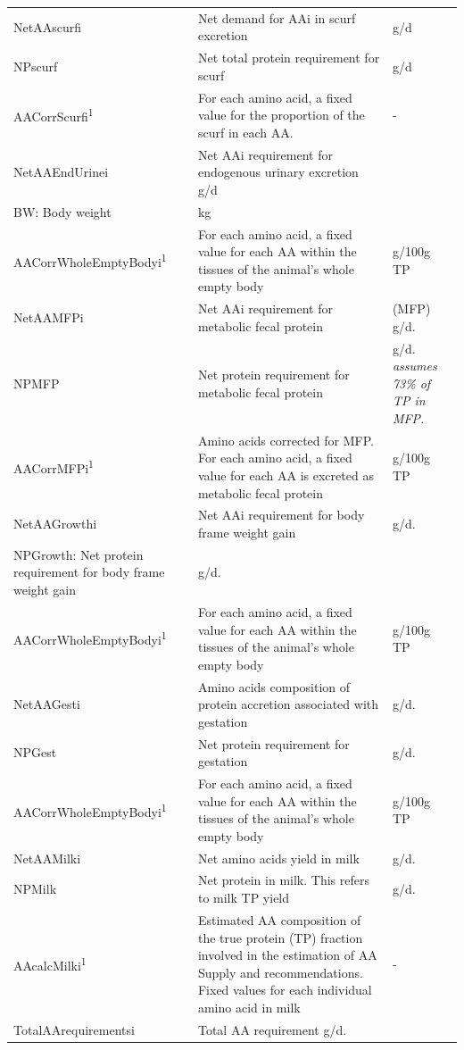 \documentclass{article}
\begin{document}
\begin{refsection}
\begin{longtable}{@{} L{5cm} L{5.5cm} L{2.5cm} @{}}
NetAAscurfi &  Net demand for AAi in scurf excretion  &  g/d \\
NPscurf &  Net total protein requirement for scurf &  g/d\\
AACorrScurfi\textsuperscript{1} &  For each amino acid, a fixed value for the proportion of the scurf in each AA.  &  - \\
NetAAEndUrinei &  Net AAi requirement for endogenous urinary excretion g/d\\
BW: Body weight &  kg\\
AACorrWholeEmptyBodyi\textsuperscript{1} &  For each amino acid, a fixed value for each AA within the tissues of the animal’s whole empty body  &  g/100g TP \\
NetAAMFPi & Net AAi requirement for metabolic fecal protein  & (MFP) g/d.\\
NPMFP &  Net protein requirement for metabolic fecal protein  & g/d. \textit{\small assumes 73\% of TP in MFP.}\\
AACorrMFPi\textsuperscript{1} &  Amino acids corrected for MFP. For each amino acid, a fixed value for each AA is excreted as metabolic fecal protein &  g/100g TP\\
NetAAGrowthi &  Net AAi requirement for body frame weight gain &  g/d.\\
NPGrowth: Net protein requirement for body frame weight gain &  g/d.\\
AACorrWholeEmptyBodyi\textsuperscript{1} &  For each amino acid, a fixed value for each AA within the tissues of the animal’s whole empty body  &  g/100g TP\\
NetAAGesti & Amino acids composition of protein accretion associated with gestation &  g/d.\\
NPGest &  Net protein requirement for gestation &  g/d.\\
AACorrWholeEmptyBodyi\textsuperscript{1} &  For each amino acid, a fixed value for each AA within the tissues of the animal’s whole empty body &  g/100g TP \\
NetAAMilki & Net amino acids yield in milk  & g/d.\\
NPMilk &  Net protein in milk. This refers to milk TP yield  & g/d.\\
AAcalcMilki\textsuperscript{1} &  Estimated AA composition of the true protein (TP) fraction involved in the estimation of AA Supply and recommendations. Fixed values for each individual amino acid in milk  &  -\\
TotalAArequirementsi &  Total AA requirement g/d.\\

\end{longtable}
\end{refsection}
\end{document}
